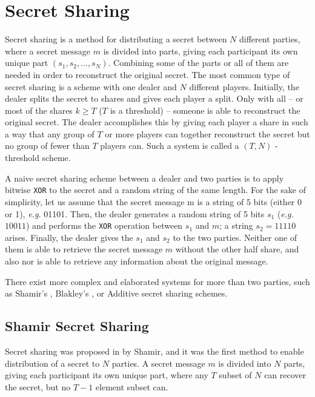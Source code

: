 \section{Secret Sharing}\label{s:secret-sharing}
Secret sharing is a method for distributing a secret between $N$ different parties, where a secret message $m$ is divided into parts, giving each participant its own unique part $(s_1, s_2, \dots, s_N)$.
Combining some of the parts or all of them are needed in order to reconstruct the original secret.
The most common type of secret sharing is a scheme with one dealer and $N$ different players.
Initially, the dealer splits the secret to shares and gives each player a split.
Only with all -- or most of the shares $k \geq T$  ($T$ is a threshold) -- someone is able to reconstruct the original secret.
The dealer accomplishes this by giving each player a share in such a way that any group of $T$ or more players can together reconstruct the secret but no group of fewer than $T$ players can.
Such a system is called a $(T, N)$ - threshold scheme.

A naive secret sharing scheme between a dealer and two parties is to apply bitwise \texttt{XOR} to the secret and a random string of the same length.
For the sake of simplicity, let us assume that the secret message m is a string of 5 bits (either 0 or 1), \textit{e.g.} 01101.
Then, the dealer generates a random string of 5 bits $s_1$ (\textit{e.g.} $10011$) and performs the \texttt{XOR} operation between $s_1$ and $m$; a string $s_2 = 11110$ arises.
Finally, the dealer gives the $s_1$ and $s_2$ to the two parties.
Neither one of them is able to retrieve the secret message $m$ without the other half share, and also nor is able to retrieve any information about the original message.

There exist more complex and elaborated systems for more than two parties, such as Shamir’s \cite{shamir1979share}, Blakley’s \cite{blakley1994linear}, or Additive \cite{kim2003designs} secret sharing schemes.


\subsection{Shamir Secret Sharing}\label{ss:shamir-secret-sharing}
Secret sharing was proposed in \cite{shamir1979share} by Shamir, and it was the first method to enable distribution of a secret to $N$ parties.
A secret message $m$ is divided into $N$ parts, giving each participant its own unique part, where any $T$ subset of $N$ can recover the secret, but no $T-1$ element subset can.

